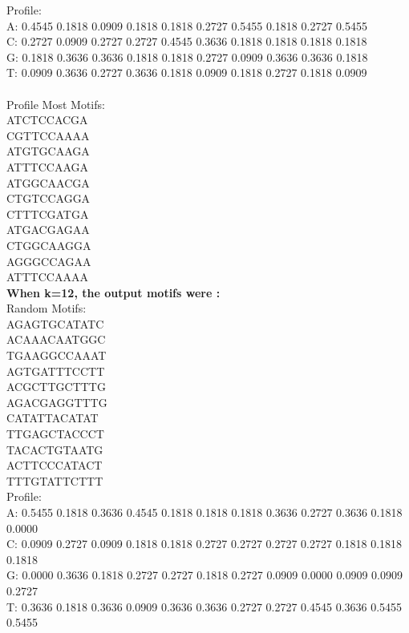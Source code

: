 \documentclass{report}
\begin{document}
Profile:\\
A: 0.4545 0.1818 0.0909 0.1818 0.1818 0.2727 0.5455 0.1818 0.2727 0.5455\\
C: 0.2727 0.0909 0.2727 0.2727 0.4545 0.3636 0.1818 0.1818 0.1818 0.1818\\
G: 0.1818 0.3636 0.3636 0.1818 0.1818 0.2727 0.0909 0.3636 0.3636 0.1818\\
T: 0.0909 0.3636 0.2727 0.3636 0.1818 0.0909 0.1818 0.2727 0.1818 0.0909\\
\\
Profile Most Motifs:\\
ATCTCCACGA\\
CGTTCCAAAA\\
ATGTGCAAGA\\
ATTTCCAAGA\\
ATGGCAACGA\\
CTGTCCAGGA\\
CTTTCGATGA\\
ATGACGAGAA\\
CTGGCAAGGA\\
AGGGCCAGAA\\
ATTTCCAAAA\\
\textbf{When k=12, the output motifs were :}\\
Random Motifs:\\
AGAGTGCATATC\\
ACAAACAATGGC\\
TGAAGGCCAAAT\\
AGTGATTTCCTT\\
ACGCTTGCTTTG\\
AGACGAGGTTTG\\
CATATTACATAT\\
TTGAGCTACCCT\\
TACACTGTAATG\\
ACTTCCCATACT\\
TTTGTATTCTTT\\

Profile:\\
A: 0.5455 0.1818 0.3636 0.4545 0.1818 0.1818 0.1818 0.3636 0.2727 0.3636 0.1818 0.0000\\
C: 0.0909 0.2727 0.0909 0.1818 0.1818 0.2727 0.2727 0.2727 0.2727 0.1818 0.1818 0.1818\\
G: 0.0000 0.3636 0.1818 0.2727 0.2727 0.1818 0.2727 0.0909 0.0000 0.0909 0.0909 0.2727\\
T: 0.3636 0.1818 0.3636 0.0909 0.3636 0.3636 0.2727 0.2727 0.4545 0.3636 0.5455 0.5455\\
\end{document}

